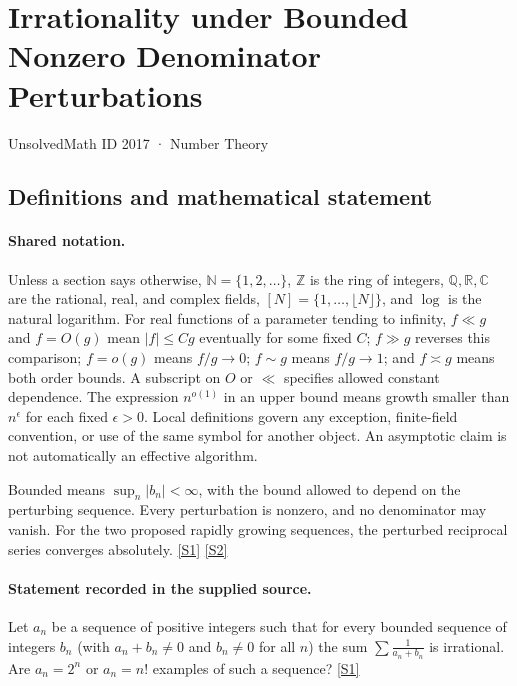 \documentclass[11pt,a4paper]{article}
\newcommand{\N}{\mathbb{N}}
\newcommand{\Z}{\mathbb{Z}}
\newcommand{\Q}{\mathbb{Q}}
\newcommand{\R}{\mathbb{R}}
\newcommand{\C}{\mathbb{C}}
\newcommand{\sref}[2]{\hyperlink{source:#1:#2}{[S#2]}}
\begin{document}

\setcounter{section}{2016}

\section{Irrationality under Bounded Nonzero Denominator Perturbations}\label{2017}

{\small\sffamily UnsolvedMath ID 2017 · Number Theory}

\subsection{Definitions and mathematical statement}

\paragraph{Shared notation.}Unless a section says otherwise, $\N=\{1,2,\ldots\}$,
$\Z$ is the ring of integers, $\Q,\R,\C$ are the rational, real, and complex
fields, $[N]=\{1,\ldots,\lfloor N\rfloor\}$, and $\log$ is the natural
logarithm. For real functions of a parameter tending to infinity,
$f\ll g$ and $f=O(g)$ mean $|f|\leq Cg$ eventually for some fixed $C$;
$f\gg g$ reverses this comparison; $f=o(g)$ means $f/g\to0$;
$f\sim g$ means $f/g\to1$; and $f\asymp g$ means both order bounds.
A subscript on $O$ or $\ll$ specifies allowed constant dependence.
The expression $n^{o(1)}$ in an upper bound means growth smaller than
$n^\epsilon$ for each fixed $\epsilon>0$. Local definitions govern any
exception, finite-field convention, or use of the same symbol for another
object. An asymptotic claim is not automatically an effective algorithm.



Bounded means $\sup_n|b_n|<\infty$, with the bound allowed to depend on the perturbing sequence. Every perturbation is nonzero, and no denominator may vanish. For the two proposed rapidly growing sequences, the perturbed reciprocal series converges absolutely. \sref{2017}{1} \sref{2017}{2}

\paragraph{Statement recorded in the supplied source.}
Let $a_n$ be a sequence of positive integers such that for every bounded sequence of integers $b_n$ (with $a_n+b_n\neq 0$ and $b_n\neq 0$ for all $n$) the sum $ \sum \frac{1}{a_n+b_n} $ is irrational. Are $a_n=2^n$ or $a_n=n!$ examples of such a sequence? \sref{2017}{1}
\end{document}
